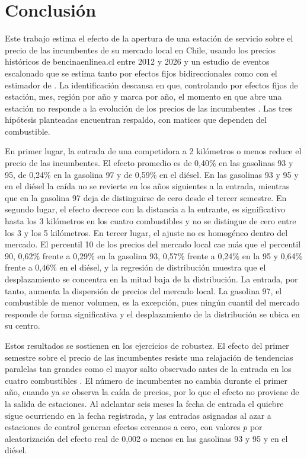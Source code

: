 \section{Conclusión} \label{sec:conclusion}

Este trabajo estima el efecto de la apertura de una estación de servicio sobre el precio de las incumbentes de su mercado local en Chile, usando los precios históricos de bencinaenlinea.cl entre 2012 y 2026 y un estudio de eventos escalonado que se estima tanto por efectos fijos bidireccionales como con el estimador de \textcite{SUNABRAHAM2021}. La identificación descansa en que, controlando por efectos fijos de estación, mes, región por año y marca por año, el momento en que abre una estación no responde a la evolución de los precios de las incumbentes \parencite{ARCIDIACONO2020,FISCHER2025}. Las tres hipótesis planteadas encuentran respaldo, con matices que dependen del combustible.

En primer lugar, la entrada de una competidora a 2 kilómetros o menos reduce el precio de las incumbentes. El efecto promedio es de 0,40\% en las gasolinas 93 y 95, de 0,24\% en la gasolina 97 y de 0,59\% en el diésel. En las gasolinas 93 y 95 y en el diésel la caída no se revierte en los años siguientes a la entrada, mientras que en la gasolina 97 deja de distinguirse de cero desde el tercer semestre. En segundo lugar, el efecto decrece con la distancia a la entrante, es significativo hasta los 3 kilómetros en los cuatro combustibles y no se distingue de cero entre los 3 y los 5 kilómetros. En tercer lugar, el ajuste no es homogéneo dentro del mercado. El percentil 10 de los precios del mercado local cae más que el percentil 90, 0,62\% frente a 0,29\% en la gasolina 93, 0,57\% frente a 0,24\% en la 95 y 0,64\% frente a 0,46\% en el diésel, y la regresión de distribución muestra que el desplazamiento se concentra en la mitad baja de la distribución. La entrada, por tanto, aumenta la dispersión de precios del mercado local. La gasolina 97, el combustible de menor volumen, es la excepción, pues ningún cuantil del mercado responde de forma significativa y el desplazamiento de la distribución se ubica en su centro.

Estos resultados se sostienen en los ejercicios de robustez. El efecto del primer semestre sobre el precio de las incumbentes resiste una relajación de tendencias paralelas tan grandes como el mayor salto observado antes de la entrada en los cuatro combustibles \parencite{RAMBACHAN2023}. El número de incumbentes no cambia durante el primer año, cuando ya se observa la caída de precios, por lo que el efecto no proviene de la salida de estaciones. Al adelantar seis meses la fecha de entrada el quiebre sigue ocurriendo en la fecha registrada, y las entradas asignadas al azar a estaciones de control generan efectos cercanos a cero, con valores $p$ por aleatorización del efecto real de 0,002 o menos en las gasolinas 93 y 95 y en el diésel.

